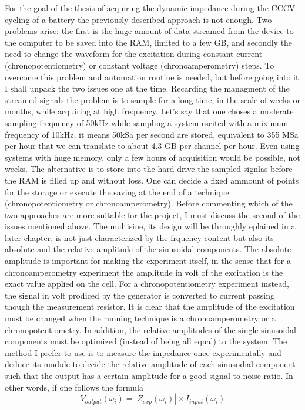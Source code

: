 For the goal of the thesis of acquiring the dynamic impedance during the CCCV cycling of a battery the previously described approach is not enough. Two problems arise: the first is the huge amount of data streamed from the device to the computer to be saved into the RAM, limited to a few GB, and secondly the need to change the waveform for the excitation  during constant current (chronopotentiometry) or constant voltage (chronoamperometry) steps. To overcome this problem and automation routine is needed, but before going into it I shall unpack the two issues one at the time. Recarding the managment of the streamed signals the problem is to sample for a long time, in the scale of weeks or months, while acquiring at high frequency. Let's say that one choses a moderate sampling frequency of 50kHz while sampling a system escited with a miximum frequency of 10kHz, it means 50kSa per second are stored, equivalent to 355 MSa per hour that we can translate to about 4.3 GB per channel per hour. Even using systems with huge memory, only a few hours of acquisition would be possible, not weeks. The alternative is to store into the hard drive the sampled signlas before the RAM is filled up and without loss. One can decide a fixed ammount of points for the storage or execute the saving at the end of a technique (chronopotentiometry or chronoamperometry). Before commenting which of the two approaches are more suitable for the project, I must discuss the second of the issues mentioned above. The multisine, its design will be throughly eplained in a later chapter, is not just characterized by the frquency content but also its absolute and the relative amplitude of the sinusoidal components. The absolute amplitude is important for making the experiment itself, in the sense that for a chronoamperometry experiment the amplitude in volt of the excitation is the exact value applied on the cell. For a chronopotentiometry experiment instead, the signal in volt prodiced by the generator is converted to current passing though the measurement resistor. It is clear that the amplitude of the excitation must be changed when the running technique is a chronoamperometry or a chronopotentiometry. In addition, the relative amplitudes of the single sinusoidal components must be optimized (instead of being all equal) to the system. The method I prefer to use is to measure the impedance once experimentally and deduce its module to decide the relative amplitude of each sinusodial component such that the output has a certain amplitude for a good signal to noise ratio. In other words, if one follows the formula
$$
V_{output}(\omega _i) = |Z_{exp}(\omega _i)| \times I_{input}(\omega _i)
$$

